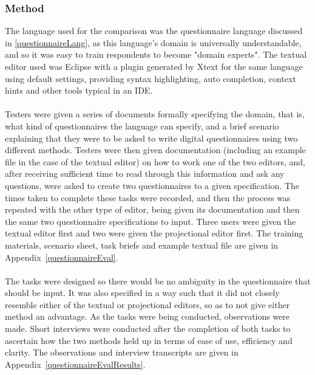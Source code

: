 \documentclass{article}
\begin{document}
{\subsubsection{Method}
The language used for the comparison was the questionnaire language discussed in \ref{questionnaireLang}, as this language's domain is universally understandable, and so it was easy to train respondents to become "domain experts". The textual editor used was Eclipse with a plugin generated by Xtext for the same language using default settings, providing syntax highlighting, auto completion, context hints and other tools typical in an IDE.
\\
\\
Testers were given a series of documents formally specifying the domain, that is, what kind of  questionnaires the language can specify, and a brief scenario explaining that they were to be asked to write digital questionnaires using two different methods. Testers were then given documentation (including an example file in the case of the textual editor) on how to work one of the two editors, and, after receiving sufficient time to read through this information and ask any questions, were asked to create two questionnaires to a given specification. The times taken to complete these tasks were recorded, and then the process was repeated with the other type of editor, being given its documentation and then the same two questionnaire specifications to input. Three users were given the textual editor first and two were given the projectional editor first. The training materials, scenario sheet, task briefs and example textual file are given in Appendix~\ref{questionnaireEval}.
\\
\\
The tasks were designed so there would be no ambiguity in the questionnaire that should be input. It was also specified in a way such that it did not closely resemble either of the textual or projectional editors, so as to not give either method an advantage. As the tasks were being conducted, observations were made. Short interviews were conducted after the completion of both tasks to ascertain how the two methods held up in terms of ease of use, efficiency and clarity. The observations and interview transcripts are given in Appendix~\ref{questionnaireEvalResults}.

}
\end{document}

